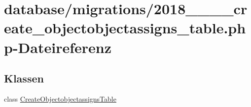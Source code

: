 \hypertarget{2018__06__19__120455__create__objectobjectassigns__table_8php}{}\section{database/migrations/2018\+\_\+\_\+\_\+\_\+create\+\_\+objectobjectassigns\+\_\+table.php-\/\+Dateireferenz}
\label{2018__06__19__120455__create__objectobjectassigns__table_8php}
\subsection*{Klassen}
\begin{DoxyCompactItemize}
\item 
class \hyperlink{classCreateObjectobjectassignsTable}{Create\+Objectobjectassigns\+Table}
\end{DoxyCompactItemize}
